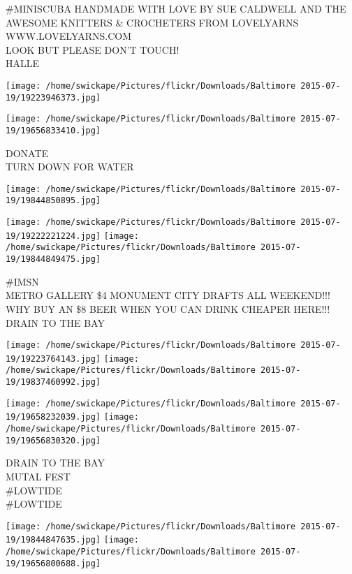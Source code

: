 \documentclass[10pt,letterpaper]{article}
\begin{document}
\#MINISCUBA HANDMADE WITH LOVE BY SUE CALDWELL AND THE AWESOME KNITTERS \& CROCHETERS FROM LOVELYARNS WWW.LOVELYARNS.COM\\
LOOK BUT PLEASE DON'T TOUCH!\\
HALLE\\
\pagebreak

\texttt{[image: /home/swickape/Pictures/flickr/Downloads/Baltimore 2015-07-19/19223946373.jpg]}

\vspace{0.25in}
\texttt{[image: /home/swickape/Pictures/flickr/Downloads/Baltimore 2015-07-19/19656833410.jpg]}

DONATE\\
TURN DOWN FOR WATER\\
\pagebreak

\texttt{[image: /home/swickape/Pictures/flickr/Downloads/Baltimore 2015-07-19/19844850895.jpg]}

\vspace{0.25in}
\texttt{[image: /home/swickape/Pictures/flickr/Downloads/Baltimore 2015-07-19/19222221224.jpg]}
\texttt{[image: /home/swickape/Pictures/flickr/Downloads/Baltimore 2015-07-19/19844849475.jpg]}

\#IMSN\\
METRO GALLERY \$4 MONUMENT CITY DRAFTS ALL WEEKEND!!!  WHY BUY AN \$8 BEER WHEN YOU CAN DRINK CHEAPER HERE!!!\\
DRAIN TO THE BAY\\
\pagebreak

\texttt{[image: /home/swickape/Pictures/flickr/Downloads/Baltimore 2015-07-19/19223764143.jpg]}
\texttt{[image: /home/swickape/Pictures/flickr/Downloads/Baltimore 2015-07-19/19837460992.jpg]}

\texttt{[image: /home/swickape/Pictures/flickr/Downloads/Baltimore 2015-07-19/19658232039.jpg]}
\texttt{[image: /home/swickape/Pictures/flickr/Downloads/Baltimore 2015-07-19/19656830320.jpg]}

DRAIN TO THE BAY\\
MUTAL FEST\\
\#LOWTIDE\\
\#LOWTIDE\\
\pagebreak

\texttt{[image: /home/swickape/Pictures/flickr/Downloads/Baltimore 2015-07-19/19844847635.jpg]}
\texttt{[image: /home/swickape/Pictures/flickr/Downloads/Baltimore 2015-07-19/19656800688.jpg]}
\end{document}
